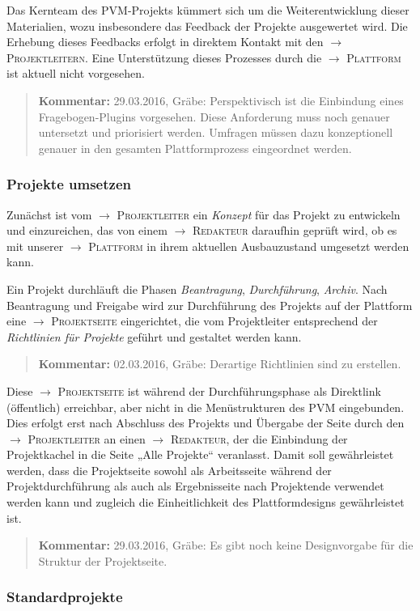 \documentclass[a4paper,11pt]{article}
\newcommand{\Kommentar}[1]{
  \begin{quote}\textbf{Kommentar:} #1 \end{quote}
}
\newcommand{\glossar}[1]{{$\to$ \textsc{#1}}}
\begin{document}
Das Kernteam des PVM-Projekts kümmert sich um die Weiterentwicklung dieser
Materialien, wozu insbesondere das Feedback der Projekte ausgewertet wird.
Die Erhebung dieses Feedbacks erfolgt in direktem Kontakt mit den
\glossar{Projektleitern}. Eine Unterstützung dieses Prozesses durch die
\glossar{Plattform} ist aktuell nicht vorgesehen.

\Kommentar{29.03.2016, Gräbe: Perspektivisch ist die Einbindung eines
  Fragebogen-Plugins vorgesehen.  Diese Anforderung muss noch genauer
  untersetzt und priorisiert werden. Umfragen müssen dazu konzeptionell
  genauer in den gesamten Plattformprozess eingeordnet werden.}

\subsubsection{Projekte umsetzen}

Zunächst ist vom \glossar{Projektleiter} ein \emph{Konzept} für das Projekt zu
entwickeln und einzureichen, das von einem \glossar{Redakteur} daraufhin
geprüft wird, ob es mit unserer \glossar{Plattform} in ihrem aktuellen
Ausbauzustand umgesetzt werden kann.

Ein Projekt durchläuft die Phasen \emph{Beantragung}, \emph{Durchführung},
\emph{Archiv}.  Nach Beantragung und Freigabe wird zur Durchführung des
Projekts auf der Plattform eine \glossar{Projektseite} eingerichtet, die vom
Projektleiter entsprechend der \emph{Richtlinien für Projekte} geführt und
gestaltet werden kann.

\Kommentar{02.03.2016, Gräbe: Derartige Richtlinien sind zu erstellen. }

Diese \glossar{Projektseite} ist während der Durchführungsphase als Direktlink
(öffentlich) erreichbar, aber nicht in die Menüstrukturen des PVM eingebunden.
Dies erfolgt erst nach Abschluss des Projekts und Übergabe der Seite durch den
\glossar{Projektleiter} an einen \glossar{Redakteur}, der die Einbindung der
Projektkachel in die Seite „Alle Projekte“ veranlasst.  Damit soll
gewährleistet werden, dass die Projektseite sowohl als Arbeitsseite während
der Projektdurchführung als auch als Ergebnisseite nach Projektende verwendet
werden kann und zugleich die Einheitlichkeit des Plattformdesigns
gewährleistet ist.

\Kommentar{29.03.2016, Gräbe: Es gibt noch keine Designvorgabe für die
  Struktur der Projektseite. }

\subsubsection{Standardprojekte}
\end{document}
